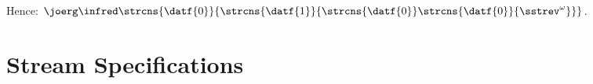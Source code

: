\documentclass[10pt]{beamer}
\begin{document}
\begin{frame}
  \vspace*{-2ex}
  Hence: $\joerg \infred 
                     \strcns{\datf{0}}{\strcns{\datf{1}}{\strcns{\datf{0}}\strcns{\datf{0}}{
                                           \sstrev^{\omega}}}}$.

\end{frame}%



\section{Stream Specifications}
\end{document}
